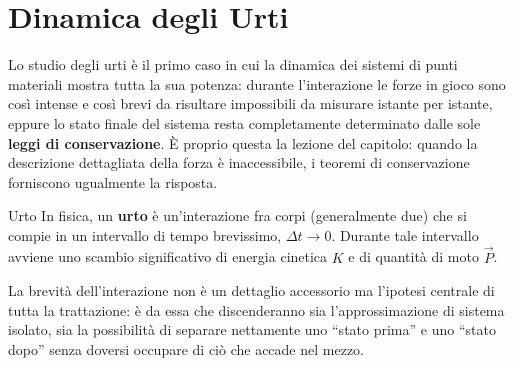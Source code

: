 \chapter{Dinamica degli Urti}

Lo studio degli urti è il primo caso in cui la dinamica dei sistemi di punti materiali mostra tutta la sua potenza: durante l'interazione le forze in gioco sono così intense e così brevi da risultare impossibili da misurare istante per istante, eppure lo stato finale del sistema resta completamente determinato dalle sole \textbf{leggi di conservazione}. È proprio questa la lezione del capitolo: quando la descrizione dettagliata della forza è inaccessibile, i teoremi di conservazione forniscono ugualmente la risposta.

\begin{definizione}{Urto}
In fisica, un \textbf{urto} è un'interazione fra corpi (generalmente due) che si compie in un intervallo di tempo brevissimo, $\Delta t \to 0$. Durante tale intervallo avviene uno scambio significativo di energia cinetica $K$ e di quantità di moto $\vec{P}$.
\end{definizione}

La brevità dell'interazione non è un dettaglio accessorio ma l'ipotesi centrale di tutta la trattazione: è da essa che discenderanno sia l'approssimazione di sistema isolato, sia la possibilità di separare nettamente uno ``stato prima'' e uno ``stato dopo'' senza doversi occupare di ciò che accade nel mezzo.

